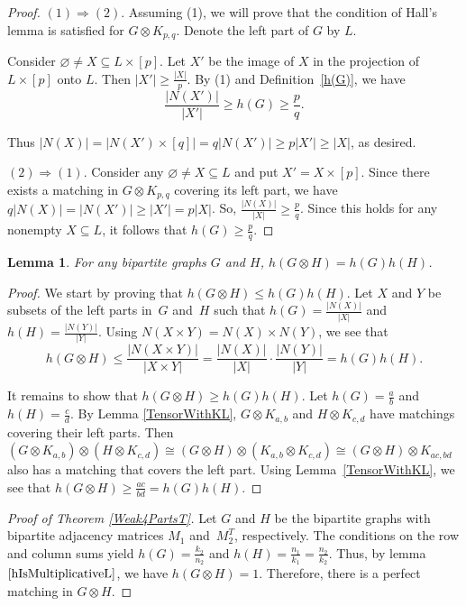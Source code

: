 \documentclass[12pt]{article}
\newtheorem{lemma}{Lemma}[section]
\theoremstyle{definition}
\theoremstyle{plain}
\renewcommand{\leq}{\leqslant}
\renewcommand{\geq}{\geqslant}
\begin{document}
\begin {proof}
$(1) \Rightarrow (2)$. Assuming (1), we will prove that the condition of Hall's lemma is satisfied for $G \otimes K_{p,q}$. Denote the left part of $G$ by $L$.

Consider $\varnothing \neq X \subseteq L \times [p]$. Let $X'$ be the image of $X$ in the projection of $L \times [p]$ onto $L$. Then $|X'| \geq \frac{|X|}{p}$. By (1) and Definition~\ref{h(G)}, we have
$$
  \frac{|N(X')|}{|X'|} \geq h(G) \geq \frac{p}{q}.
$$  

Thus $|N(X)| = |N(X') \times [q]| = q|N(X')| \geq p|X'| \geq |X|$, as desired.

$(2)\Rightarrow(1)$. Consider any $\varnothing \neq X \subseteq L$ and put $X' = X \times [p]$. Since there exists a matching in $G \otimes K_{p,q}$ covering its left part, we have $q|N(X)| = |N(X')| \geq |X'| = p|X|$. So, $\frac{|N(X)|}{|X|} \geq \frac{p}{q}$. Since this holds for any nonempty $X \subseteq L$, it follows that $h(G) \geq \frac{p}{q}$.
\end {proof}

\begin {lemma} \label {hIsMultiplicativeL}
For any bipartite graphs $G$ and $H$, $h(G \otimes H) = h(G)h(H)$.
\end {lemma}


\begin {proof} 
We start by proving that $h(G \otimes H) \leq h(G)h(H)$. Let $X$ and $Y$ be subsets of the left parts in~$G$ and~$H$ such that $h(G)=\frac{|N(X)|}{|X|}$ and $h(H)=\frac{|N(Y)|}{|Y|}$. Using $N(X \times Y) = N(X) \times N(Y)$, we see that
$$
  h(G \otimes H) \leq \frac{|N(X \times Y)|}{|X \times Y|} = \frac{|N(X)|}{|X|}\cdot \frac{|N(Y)|}{|Y|} = h(G)h(H).
$$

It remains to show that $h(G \otimes H) \geq h(G)h(H)$. Let $h(G) = \frac{a}{b}$ and $h(H) = \frac{c}{d}$. By Lemma \ref{TensorWithKL}, $G \otimes K_{a,b}$ and $H \otimes K_{c,d}$ have matchings covering their left parts. Then $(G \otimes K_{a,b}) \otimes (H \otimes K_{c,d}) \cong (G \otimes H) \otimes (K_{a,b} \otimes K_{c,d}) \cong (G \otimes H) \otimes K_{ac, bd}$ also has a matching that covers the left part. Using Lemma~\ref{TensorWithKL}, we see that $h(G \otimes H) \geq \frac{ac}{bd} = h(G)h(H)$.
\end {proof}

\begin{proof}[Proof of Theorem \ref{Weak4PartsT}]
Let $G$ and $H$ be the bipartite graphs with bipartite adjacency matrices $M_1$ and~$M_2^T$, respectively. The conditions on the row and column sums yield $h(G) = \frac{k_2}{n_2}$ and $h(H) = \frac{n_1}{k_1} = \frac{n_2}{k_2}$. Thus, by lemma $\ref{hIsMultiplicativeL}$, we have $h(G \otimes H) = 1$. Therefore, there is a perfect matching in $G \otimes H$.
\end {proof}
\end{document}
